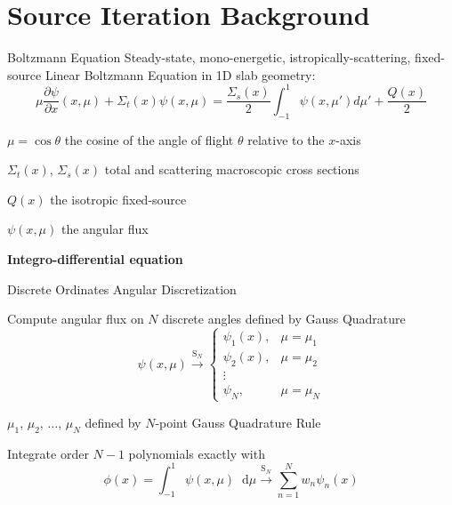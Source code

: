 \documentclass[10pt]{beamer}
\newcommand{\ud}{\mathop{}\!\mathrm{d}} %
\newcommand{\pderiv}[2]{\frac{\partial #1}{\partial #2}}
\begin{document}
\section{Source Iteration Background}

\begin{frame}{Boltzmann Equation}
    Steady-state, mono-energetic, istropically-scattering, fixed-source Linear Boltzmann Equation in 1D slab geometry:
    \begin{equation*}
        \mu \pderiv{\psi}{x}(x, \mu) + \Sigma_t(x) \psi(x,\mu) = 
        \frac{\Sigma_s(x)}{2} \int_{-1}^{1} \psi(x, \mu') d\mu' + \frac{Q(x)}{2}
    \end{equation*}

    $\mu = \cos \theta$ the cosine of the angle of flight $\theta$ relative to the $x$-axis

    $\Sigma_t(x)$, $\Sigma_s(x)$ total and scattering macroscopic cross sections 

    $Q(x)$ the isotropic fixed-source

    $\psi(x,\mu)$ the angular flux 


    \vfill
    \centerline{\textbf{Integro-differential equation}}

\end{frame}

\begin{frame}{Discrete Ordinates Angular Discretization}

    Compute angular flux on $N$ discrete angles defined by Gauss Quadrature 
    \begin{equation*}
        \psi(x,\mu) \xrightarrow{\text{S}_N} 
        \begin{cases}
            \psi_1(x), & \mu = \mu_1 \\ 
            \psi_2(x), & \mu = \mu_2 \\ 
            \vdots \\ 
            \psi_N, & \mu = \mu_N 
        \end{cases}
    \end{equation*}

    $\mu_1$, $\mu_2$, $\dots$, $\mu_N$ defined by $N$-point Gauss Quadrature Rule 

    Integrate order $N-1$ polynomials exactly with 
    \begin{equation*}
        \phi(x) = \int_{-1}^1 \psi(x, \mu) \ud\mu 
            \xrightarrow{\text{S}_N} \sum_{n=1}^N 
            w_n \psi_n(x)
    \end{equation*}

\end{frame}
\end{document}
